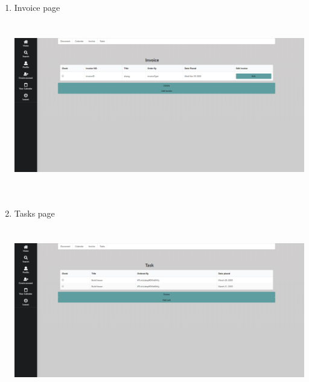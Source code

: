 \documentclass[onecolumn, draftclsnofoot,10pt, compsoc]{IEEEtran}
\begin{document}
\begin{enumerate}
\item Invoice page\newline\newline
\includegraphics[width=13cm, height=8cm]{web-invoice-page.png}\newline
\newpage
\item Tasks page\newline\newline
\includegraphics[width=13cm, height=8cm]{web-tasks-page.png}\newline
    

\end{enumerate}
\end{document}
